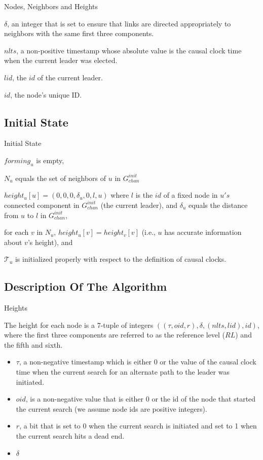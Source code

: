 \documentclass{beamer}
\begin{document}
\begin{frame}{Nodes, Neighbors and Heights}
		\item $\delta$, an integer that is set to ensure that links are directed appropriately to neighbors with the same first three components.
	\item $nlts$, a non-positive timestamp whose absolute value is the causal clock time when the current leader was elected.
	\item $lid$, the $id$ of the current leader.
	\item $id$, the node’s unique ID.
\end{frame}
\subsection{Initial State}
\begin{frame}{Initial State}
\begin{list}{--}
	\item $forming_u$ is empty,
	\item $N_u$ equals the set of neighbors of $u$ in $G^{init} _{chan}$
	\item $height_u[u] = (0, 0, 0, \delta _u , 0, l, u)$ where $l$ is the $id$ of a fixed node in $u's$ connected component in $G^{init} _{chan}$ (the current leader), and $\delta _u$ equals the distance from $u$ to $l$ in $G^{init} _{chan}$,
	\item for each $v$ in $N_u$, $height_u[v] = height_v[v]$ (i.e., $u$ has accurate information about $v$’s height), and
	\item $\mathcal{T} _u$ is initialized properly with respect to the definition of causal clocks.
\end{list}
\end{frame}


\subsection{Description Of The Algorithm}
\begin{frame}{Heights}

The height for each node is a 7-tuple of integers $((\tau , oid, r), \delta, (nlts, lid), id)$, where the first three components are referred to as the reference level ($RL$) and the fifth and sixth.

\begin{itemize}
	\item $\tau$, a non-negative timestamp which is either 0 or the value of the causal clock time when the current search for an alternate path to the leader was initiated.
	\item $oid$, is a non-negative value that is either 0 or the id of the node that started the current search (we assume node ids are positive integers).
	\item $r$, a bit that is set to 0 when the current search is initiated and set to 1 when the current search hits a dead end.
	\item $\delta$

\end{itemize}

\end{frame}
\end{document}
